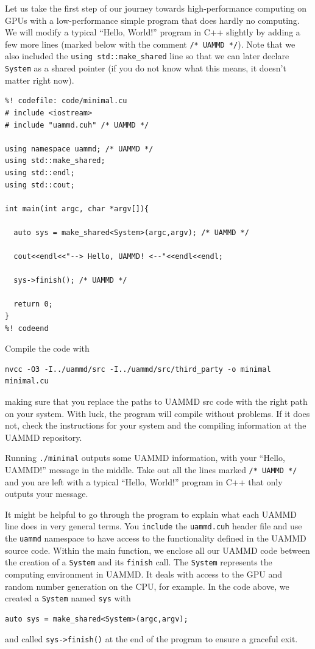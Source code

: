 Let us take the first step of our journey towards high-performance computing on
GPUs with a low-performance simple program that does hardly no computing. We
will modify a typical ``Hello, World!'' program in C++ slightly by adding a few
more lines (marked below with the comment \texttt{/* UAMMD */}). Note that we
also included the \texttt{using std::make\_shared} line so that we can later
declare \texttt{System} as a shared pointer (if you do not know what this means,
it doesn't matter right now).
\begin{lstlisting}
%! codefile: code/minimal.cu
# include <iostream>
# include "uammd.cuh" /* UAMMD */

using namespace uammd; /* UAMMD */
using std::make_shared;
using std::endl;
using std::cout;

int main(int argc, char *argv[]){

  auto sys = make_shared<System>(argc,argv); /* UAMMD */

  cout<<endl<<"--> Hello, UAMMD! <--"<<endl<<endl;

  sys->finish(); /* UAMMD */

  return 0;
}
%! codeend
\end{lstlisting}
Compile the code with
\begin{verbatim}
nvcc -O3 -I../uammd/src -I../uammd/src/third_party -o minimal
minimal.cu
\end{verbatim}
making sure that you replace the paths to UAMMD src code with the right path on
your system. With luck, the program will compile without problems. If it does
not, check the instructions for your system and the compiling information at the
UAMMD repository.

Running \texttt{./minimal} outputs some UAMMD information, with your ``Hello, 
UAMMD!'' message in the middle. Take out all the lines marked \texttt{/* UAMMD 
*/} and you are left with a typical ``Hello, World!'' program in C++ that only 
outputs your message.

It might be helpful to go through the program to explain what each UAMMD line 
does in very general terms. You \texttt{include} the \texttt{uammd.cuh} header 
file and use the \texttt{uammd} namespace to have access to the functionality 
defined in the UAMMD source code. Within the main function, we enclose all our 
UAMMD code between the creation of a \texttt{System} and its \texttt{finish}
call. The \texttt{System} represents the computing environment in UAMMD. It
deals with access to the GPU and random number generation on the CPU, for
example. In the code above, we created a \texttt{System} named \texttt{sys} with
\begin{verbatim}
auto sys = make_shared<System>(argc,argv);
\end{verbatim}
and called \texttt{sys->finish()} at the end of the program to ensure a graceful
exit.

